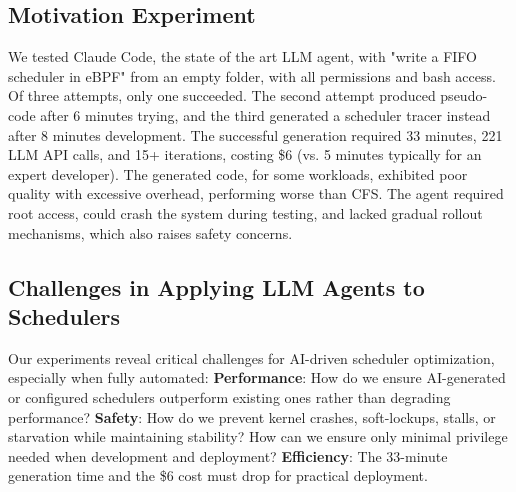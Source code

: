 \subsection{Motivation Experiment}

We tested Claude Code\cite{claudecode}, the state of the art LLM agent, with "write a FIFO scheduler in eBPF" from an empty folder, with all permissions and bash access. Of three attempts, only one succeeded. The second attempt produced pseudo-code after 6 minutes trying, and the third generated a scheduler tracer instead after 8 minutes development. The successful generation required 33 minutes, 221 LLM API calls, and 15+ iterations, costing \$6 (vs. 5 minutes typically for an expert developer). The generated code, for some workloads, exhibited poor quality with excessive overhead, performing worse than CFS. The agent required root access, could crash the system during testing, and lacked gradual rollout mechanisms, which also raises safety concerns.

\subsection{Challenges in Applying LLM Agents to Schedulers}

Our experiments reveal critical challenges for AI-driven scheduler optimization, especially when fully automated: \textbf{Performance}: How do we ensure AI-generated or configured schedulers outperform existing ones rather than degrading performance? \textbf{Safety}: How do we prevent kernel crashes, soft-lockups, stalls, or starvation while maintaining stability? How can we ensure only minimal privilege needed when development and deployment? \textbf{Efficiency}: The 33-minute generation time and the \$6 cost must drop for practical deployment.
